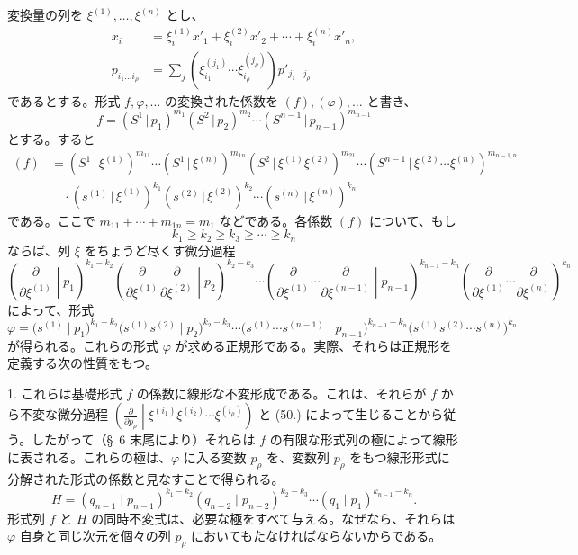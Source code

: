 \documentclass[11pt]{article}
\newcommand{\pair}[2]{(#1\,|\,#2)}
\begin{document}
変換量の列を $\xi^{(1)},\ldots,\xi^{(n)}$ とし、
\begin{equation}
\begin{aligned}
x_i&=\xi_i^{(1)}x'_1+\xi_i^{(2)}x'_2+\cdots+\xi_i^{(n)}x'_n,\\
p_{i_1\ldots i_\rho}&=\sum_j(\xi_{i_1}^{(j_1)}\cdots \xi_{i_\rho}^{(j_\rho)})p'_{j_1\ldots j_\rho}
\end{aligned}
\tag{47}
\end{equation}
であるとする。形式 $f,\varphi,\ldots$ の変換された係数を $(f),(\varphi),\ldots$ と書き、
\[
 f=\pair{S^1}{p_1}^{m_1}\pair{S^2}{p_2}^{m_2}\cdots\pair{S^{n-1}}{p_{n-1}}^{m_{n-1}}
\]
とする。すると
\begin{equation}
\begin{aligned}
(f)&=\pair{S^1}{\xi^{(1)}}^{m_{11}}\cdots\pair{S^1}{\xi^{(n)}}^{m_{1n}}
\pair{S^2}{\xi^{(1)}\xi^{(2)}}^{m_{21}}\cdots
\pair{S^{n-1}}{\xi^{(2)}\cdots\xi^{(n)}}^{m_{n-1,n}}\\
&\quad\cdot\pair{s^{(1)}}{\xi^{(1)}}^{k_1}\pair{s^{(2)}}{\xi^{(2)}}^{k_2}\cdots\pair{s^{(n)}}{\xi^{(n)}}^{k_n}
\end{aligned}
\tag{48}
\end{equation}
である。ここで $m_{11}+\cdots+m_{1n}=m_1$ などである。各係数 $(f)$ について、もし
\begin{equation}
 k_1\ge k_2\ge k_3\ge\cdots\ge k_n
\tag{49}
\end{equation}
ならば、列 $\xi$ をちょうど尽くす微分過程
\begin{equation}
\left(\frac{\partial}{\partial\xi^{(1)}}\middle|p_1\right)^{k_1-k_2}
\left(\frac{\partial}{\partial\xi^{(1)}}\frac{\partial}{\partial\xi^{(2)}}\middle|p_2\right)^{k_2-k_3}
\cdots
\left(\frac{\partial}{\partial\xi^{(1)}}\cdots\frac{\partial}{\partial\xi^{(n-1)}}\middle|p_{n-1}\right)^{k_{n-1}-k_n}
\left(\frac{\partial}{\partial\xi^{(1)}}\cdots\frac{\partial}{\partial\xi^{(n)}}\right)^{k_n}
\tag{50}
\end{equation}
によって、形式
\begin{equation}
 \varphi=\bigl(s^{(1)}\mid p_1\bigr)^{k_1-k_2}
 \bigl(s^{(1)}s^{(2)}\mid p_2\bigr)^{k_2-k_3}\cdots
 \bigl(s^{(1)}\cdots s^{(n-1)}\mid p_{n-1}\bigr)^{k_{n-1}-k_n}
 \bigl(s^{(1)}s^{(2)}\cdots s^{(n)}\bigr)^{k_n}
\tag{51}
\end{equation}
が得られる。これらの形式 $\varphi$ が求める正規形である。実際、それらは正規形を定義する次の性質をもつ。

1. これらは基礎形式 $f$ の係数に線形な不変形成である。これは、それらが $f$ から不変な微分過程 $\left(\frac{\partial}{\partial p_\rho}\middle|\xi^{(i_1)}\xi^{(i_2)}\cdots\xi^{(i_\rho)}\right)$ と (50.) によって生じることから従う。したがって（\S\ 6 末尾により）それらは $f$ の有限な形式列の極によって線形に表される。これらの極は、$\varphi$ に入る変数 $p_\rho$ を、変数列 $p_\rho$ をもつ線形形式に分解された形式の係数と見なすことで得られる。
\begin{equation}
 H=(q_{n-1}\mid p_{n-1})^{k_1-k_2}(q_{n-2}\mid p_{n-2})^{k_2-k_3}\cdots(q_1\mid p_1)^{k_{n-1}-k_n}.
\tag{52}
\end{equation}
形式列 $f$ と $H$ の同時不変式は、必要な極をすべて与える。なぜなら、それらは $\varphi$ 自身と同じ次元を個々の列 $p_\rho$ においてもたなければならないからである。
\end{document}
